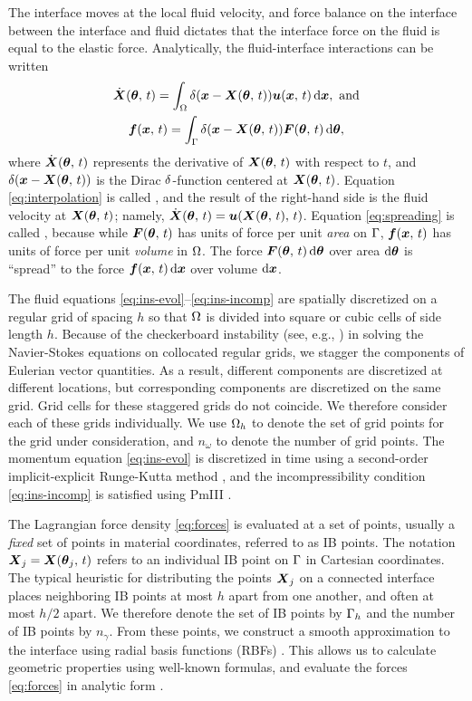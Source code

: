 The interface moves at the local fluid velocity, and force balance on the interface
between the interface and fluid dictates that the interface force on the fluid is equal
to the elastic force. Analytically, the fluid-interface interactions can be written
\begin{gather}
    \label{eq:interpolation}
    \U(\params,\,t) = \int_\domain \Dirac(\x-\X(\params,\,t)) \u(\x,\,t)\d\x,\ \text{and} \\
    \label{eq:spreading}
    \f(\x,\,t) = \int_\interface \Dirac(\x-\X(\params,\,t))\F(\params,\,t)\d\params,
\end{gather}
where $\dot{\boldsymbol{X}}(\boldsymbol{\theta},\,t)$ represents the derivative of $\boldsymbol{X}(\boldsymbol{\theta},\,t)$ with respect to
$t$, and $\delta(\boldsymbol{x}-\boldsymbol{X}(\boldsymbol{\theta},\,t))$ is the Dirac $\delta$-function centered at
$\boldsymbol{X}(\boldsymbol{\theta},\,t)$.  Equation \eqref{eq:interpolation} is called , and
the result of the right-hand side is the fluid velocity at $\boldsymbol{X}(\boldsymbol{\theta},\,t)$; namely,
$\dot{\boldsymbol{X}}(\boldsymbol{\theta},\,t) = \boldsymbol{u}(\boldsymbol{X}(\boldsymbol{\theta},\,t),\,t)$.  Equation \eqref{eq:spreading} is called
, because while $\boldsymbol{F}(\boldsymbol{\theta},\,t)$ has units of force per unit \emph{area}
on $\Gamma$, $\boldsymbol{f}(\boldsymbol{x},\,t)$ has units of force per unit \emph{volume} in $\Omega$. The
force $\F(\params,\,t)\d\params$ over area $\d\params$ is ``spread'' to the force
$\f(\x,\,t)\d\x$ over volume $\d\x$. 

The fluid equations \eqref{eq:ins-evol}--\eqref{eq:ins-incomp} are spatially discretized
on a regular grid of spacing $h$ so that $\Omega$ is divided into square or cubic cells
of side length $h$. Because of the checkerboard instability (see, e.g.,
\cite{Wesseling:2001ci}) in solving the Navier-Stokes equations on collocated regular
grids, we stagger the components of Eulerian vector quantities. As a result, different
components are discretized at different locations, but corresponding components are
discretized on the same grid. Grid cells for these staggered grids do not coincide. We
therefore consider each of these grids individually. We use $\Omega_h$ to denote the set
of grid points for the grid under consideration, and $n_\omega$ to denote the number of
grid points. The momentum equation \eqref{eq:ins-evol} is discretized in time using a
second-order implicit-explicit Runge-Kutta method \cite{Peskin:2002go}, and the
incompressibility condition \eqref{eq:ins-incomp} is satisfied using PmIII
\cite{Brown:2001bq}.

The Lagrangian force density \eqref{eq:forces} is evaluated at a set of points, usually a
\emph{fixed} set of points in material coordinates, referred to as IB points. The
notation $\boldsymbol{X}_j=\boldsymbol{X}(\boldsymbol{\theta}_j,\,t)$ refers to an individual IB point on $\Gamma$ in
Cartesian coordinates. The typical heuristic for distributing the points $\boldsymbol{X}_j$ on a
connected interface places neighboring IB points at most $h$ apart from one another, and
often at most $h/2$ apart. We therefore denote the set of IB points by $\Gamma_h$ and
the number of IB points by $n_\gamma$. From these points, we construct a smooth
approximation to the interface using radial basis functions (RBFs) \cite{Shankar:2015km}.
This allows us to calculate geometric properties using well-known formulas, and evaluate
the forces \eqref{eq:forces} in analytic form \cite{Maxian:2018ek}.

